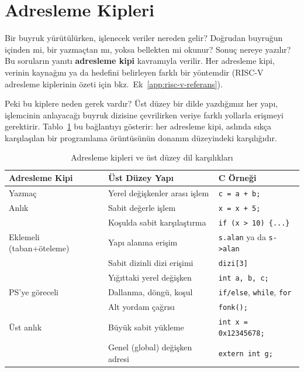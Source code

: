 \section{Adresleme Kipleri}
\label{sec:adresleme-kipleri}

Bir buyruk yürütülürken, işlenecek veriler nereden gelir? Doğrudan buyruğun içinden mi, bir yazmaçtan mı, yoksa bellekten mi okunur? Sonuç nereye yazılır? Bu soruların yanıtı \textbf{adresleme kipi} kavramıyla verilir. Her adresleme kipi, verinin kaynağını ya da hedefini belirleyen farklı bir yöntemdir (RISC-V adresleme kiplerinin özeti için bkz.\ Ek~\ref{app:risc-v-referans}).

Peki bu kiplere neden gerek vardır? Üst düzey bir dilde yazdığımız her yapı, işlemcinin anlayacağı buyruk dizisine çevrilirken veriye farklı yollarla erişmeyi gerektirir. Tablo~\ref{tab:adresleme-kipi-motivasyon} bu bağlantıyı gösterir: her adresleme kipi, aslında sıkça karşılaşılan bir programlama örüntüsünün donanım düzeyindeki karşılığıdır.

\begin{table}[H]
\centering
\caption{Adresleme kipleri ve üst düzey dil karşılıkları}
\label{tab:adresleme-kipi-motivasyon}
\small
\begin{tabular}{lll}
\toprule
\textbf{Adresleme Kipi} & \textbf{Üst Düzey Yapı} & \textbf{C Örneği} \\
\midrule
Yazmaç & Yerel değişkenler arası işlem & \texttt{c = a + b;} \\
Anlık & Sabit değerle işlem & \texttt{x = x + 5;} \\
 & Koşulda sabit karşılaştırma & \texttt{if (x > 10) \{...\}} \\
Eklemeli (taban+öteleme) & Yapı alanına erişim & \texttt{s.alan} ya da \texttt{s->alan} \\
 & Sabit dizinli dizi erişimi & \texttt{dizi[3]} \\
 & Yığıttaki yerel değişken & \texttt{int a, b, c;} \\
PS'ye göreceli & Dallanma, döngü, koşul & \texttt{if/else}, \texttt{while}, \texttt{for} \\
 & Alt yordam çağrısı & \texttt{fonk();} \\
Üst anlık & Büyük sabit yükleme & \texttt{int x = 0x12345678;} \\
 & Genel (global) değişken adresi & \texttt{extern int g;} \\
\bottomrule
\end{tabular}
\end{table}

